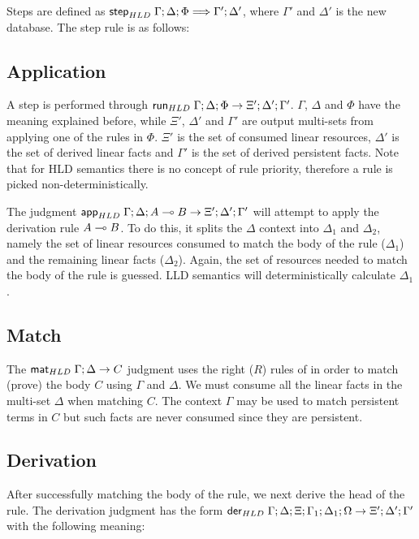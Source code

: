 Steps are defined as $\mathsf{step}_{HLD} \; \Gamma; \Delta; \Phi \Longrightarrow \Gamma';
\Delta'$, where $\Gamma'$ and $\Delta'$ is the new database. The step rule is as
follows:



\subsection{Application}

A step is performed through $\mathsf{run}_{HLD} \; \Gamma; \Delta; \Phi \rightarrow \Xi';
\Delta'; \Gamma'$.  $\Gamma$, $\Delta$ and $\Phi$ have the meaning explained
before, while $\Xi'$, $\Delta'$ and $\Gamma'$ are output multi-sets from
applying one of the rules in $\Phi$. $\Xi'$ is the set of consumed linear
resources, $\Delta'$ is the set of derived linear facts and $\Gamma'$ is the set
of derived persistent facts. Note that for HLD semantics there is no concept of
rule priority, therefore a rule is picked non-deterministically.

The judgment $\mathsf{app}_{HLD} \; \Gamma ; \Delta ; A \multimap B \rightarrow \Xi'; \Delta';
\Gamma'$ will attempt to apply the derivation rule $A \multimap B$. To do this, it
splits the $\Delta$ context into $\Delta_1$ and $\Delta_2$, namely the set of
linear resources consumed to match the body of the rule ($\Delta_1$) and the
remaining linear facts ($\Delta_2$).  Again, the set of resources needed to
match the body of the rule is guessed. LLD semantics will deterministically
calculate $\Delta_1$.



\subsection{Match}

The $\mathsf{mat}_{HLD} \; \Gamma ; \Delta \rightarrow C$ judgment uses the right ($R$) rules of
\fragment in order to match (prove) the body $C$ using $\Gamma$
and $\Delta$. We must consume all the linear facts in the multi-set $\Delta$
when matching $C$. The context $\Gamma$ may be used to match persistent terms in
$C$ but such facts are never consumed since they are persistent.



\subsection{Derivation}

After successfully matching the body of the rule, we next derive the head of the
rule. The derivation judgment has the form $\mathsf{der}_{HLD} \; \Gamma ; \Delta ; \Xi ; \Gamma_1
; \Delta_1 ; \Omega \rightarrow \Xi'; \Delta'; \Gamma'$ with the following
meaning:

